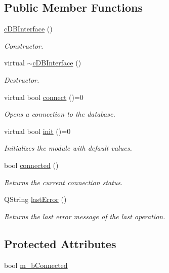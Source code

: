 \subsection*{Public Member Functions}
\begin{DoxyCompactItemize}
\item 
\hyperlink{classc_d_b_interface_a71fd9c721e72a05983a061ba8348f257}{c\+D\+B\+Interface} ()
\begin{DoxyCompactList}\small\item\em Constructor. \end{DoxyCompactList}\item 
virtual \hyperlink{classc_d_b_interface_a7146e4fb1753d18c5f13908505fb8b4c}{$\sim$c\+D\+B\+Interface} ()
\begin{DoxyCompactList}\small\item\em Destructor. \end{DoxyCompactList}\item 
virtual bool \hyperlink{classc_d_b_interface_a1831bb8f93342190f26d83f35b4a988b}{connect} ()=0
\begin{DoxyCompactList}\small\item\em Opens a connection to the database. \end{DoxyCompactList}\item 
virtual bool \hyperlink{classc_d_b_interface_a8baa6f378fb91dea077b38bd15be12c9}{init} ()=0
\begin{DoxyCompactList}\small\item\em Initializes the module with default values. \end{DoxyCompactList}\item 
bool \hyperlink{classc_d_b_interface_a31ca3accfbd6dd1d2915440a94874b7b}{connected} ()
\begin{DoxyCompactList}\small\item\em Returns the current connection status. \end{DoxyCompactList}\item 
Q\+String \hyperlink{classc_d_b_interface_a280fe85549741179ce3a23b9f417c689}{last\+Error} ()
\begin{DoxyCompactList}\small\item\em Returns the last error message of the last operation. \end{DoxyCompactList}\end{DoxyCompactItemize}
\subsection*{Protected Attributes}
\begin{DoxyCompactItemize}
\item 
bool \hyperlink{classc_d_b_interface_a28d4d17206ee596e43e8c433c11c9282}{m\+\_\+b\+Connected}
\end{DoxyCompactItemize}
